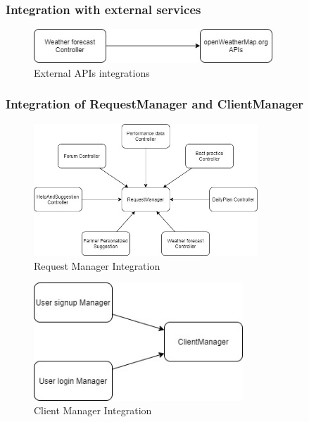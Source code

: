 \documentclass{article}
\begin{document}
    
    \subsubsection{Integration with external services}
        \begin{figure} [h]
            \centering
            \includegraphics[width=0.8\textwidth]{images/ImplementationAndTesting/ExternalAPIsIntegrations.jpg}
            \caption{\label{fig:ExternalAPIsIntegrations}External APIs integrations}
        \end{figure}
        
    \newpage
        
    
    
    \subsubsection{Integration of RequestManager and ClientManager}
        \begin{figure} [h]
            \centering
            \includegraphics[width=0.75\textwidth]{images/ImplementationAndTesting/RequestManagerIntegration.jpg}
            \caption{\label{fig:RequestManagerIntegration}Request Manager Integration}
        \end{figure}
        \begin{figure} [h]
            \centering
            \includegraphics[width=0.7\textwidth]{images/ImplementationAndTesting/ClientManagerIntegration.jpg}
            \caption{\label{fig:ClientManagerIntegration}Client Manager Integration}
        \end{figure}
\end{document}

